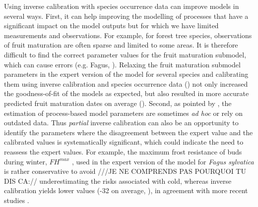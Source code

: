 \documentclass[letterpaper,8pt]{extarticle}  %
\begin{document}
\begin{doublespacing}
\begin{linenumbers}
Using inverse calibration with species occurrence data can improve models in several ways. First, it can help improving the modelling of processes that have a significant impact on the model outputs but for which we have limited measurements and observations. For example, for forest tree species, observations of fruit maturation are often sparse and limited to some areas. It is therefore difficult to find the correct parameter values for the fruit maturation submodel, which can cause errors (e.g. Fagus, ). Relaxing the fruit maturation submodel parameters in the expert version of the model for several species and calibrating them using inverse calibration and species occurrence data () not only increased the goodness-of-fit of the models as expected, but also resulted in more accurate predicted fruit maturation dates on average ().
Second, as pointed by \cite{Harrison2021}, the estimation of process-based model parameters are sometimes \emph{ad hoc} or rely on outdated data. Thus \emph{partial} inverse calibration can also be an opportunity to identify the parameters where the disagreement between the expert value and the calibrated values is systematically significant, which could indicate the need to reassess the expert values. For example, the maximum frost resistance of buds during winter, ${FH}^{max}$ , used in the expert version of the model for \emph{Fagus sylvatica} is rather conservative \citep[-20;][]{Till1956, Lenz2013} to avoid ///JE NE COMPRENDS PAS POURQUOI TU DIS CA:// underestimating the risks associated with cold, whereas inverse calibration yields lower values (-32 on average, ), in agreement with more recent studies \citep{Delaporte2015, Hofmann2015, Kreyling2014, Lenz2016}.
 

\end{linenumbers}
\end{doublespacing}
\end{document}
